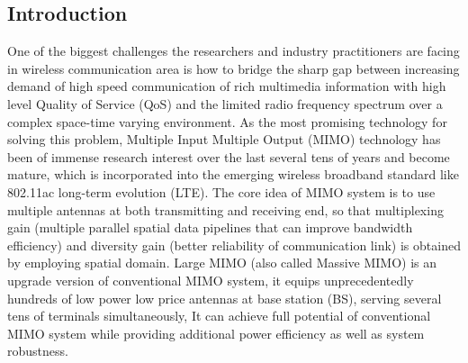 \documentclass[12pt, draftclsnofoot, onecolumn]{IEEEtran}
\begin{document}
\begin{spacing}{2}
\section{Introduction}
% 
% 
% 
% 

 
  One of the biggest challenges the researchers and industry practitioners are facing in wireless communication area is how to bridge the sharp gap between increasing demand of high speed communication of rich multimedia information with high level Quality of Service (QoS) and the limited radio frequency spectrum over a complex space-time varying environment. As the most promising technology for solving this problem, Multiple Input Multiple Output (MIMO) technology has been of immense research interest over the last several tens of years and become mature, which is incorporated into the emerging wireless broadband standard like 802.11ac\cite{IEEE802.11ac} long-term evolution (LTE)\cite{3GLTE}.  The core idea of MIMO system is to use multiple antennas at both transmitting and receiving end, so that multiplexing gain (multiple parallel spatial data pipelines that can improve bandwidth efficiency) and diversity gain (better reliability of communication link) is obtained by employing spatial domain. Large MIMO (also called Massive MIMO) is an upgrade version of conventional MIMO system, it equips   unprecedentedly hundreds of low power low price antennas at base station (BS), serving several tens of terminals simultaneously, It can achieve full potential of conventional MIMO system while providing additional power efficiency as well as system robustness\cite{rusek2013scaling}\cite{larsson2014massive}. 
    

\end{spacing}
\end{document}

